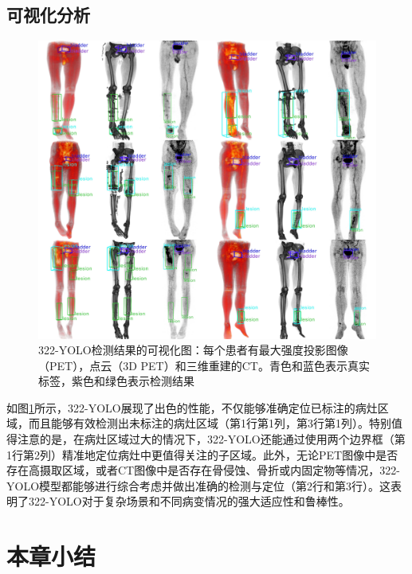 \subsection{可视化分析}
\begin{figure}
    \centering
    \includegraphics[width=\textwidth,height=\textheight,keepaspectratio]{figures/chap04_vis.jpg}
    \caption{322-YOLO检测结果的可视化图：每个患者有最大强度投影图像（PET），点云（3D PET）和三维重建的CT。青色和蓝色表示真实标签，紫色和绿色表示检测结果}
    \label{fig:chap04_vis}
\end{figure}

如图\ref{fig:chap04_vis}所示，322-YOLO展现了出色的性能，不仅能够准确定位已标注的病灶区域，而且能够有效检测出未标注的病灶区域（第1行第1列，第3行第1列）。特别值得注意的是，在病灶区域过大的情况下，322-YOLO还能通过使用两个边界框（第1行第2列）精准地定位病灶中更值得关注的子区域。此外，无论PET图像中是否存在高摄取区域，或者CT图像中是否存在骨侵蚀、骨折或内固定物等情况，322-YOLO模型都能够进行综合考虑并做出准确的检测与定位（第2行和第3行）。这表明了322-YOLO对于复杂场景和不同病变情况的强大适应性和鲁棒性。

\section{本章小结}

